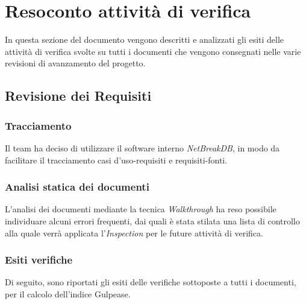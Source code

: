 \newpage
\section{Resoconto attività di verifica}

In questa sezione del documento vengono descritti e analizzati gli esiti delle attività di verifica svolte su tutti i documenti che vengono consegnati nelle varie revisioni di avanzamento del progetto.
	
	\subsection{Revisione dei Requisiti}
			
		\subsubsection{Tracciamento}
		Il team ha deciso di utilizzare il software interno \textit{NetBreakDB}, in modo da facilitare il tracciamento casi d’uso-requisiti e requisiti-fonti.
			
		\subsubsection{Analisi statica dei documenti}
		L’analisi dei documenti mediante la tecnica \textit{Walkthrough} ha reso possibile individuare alcuni errori frequenti, dai quali è stata stilata una lista di controllo alla quale verrà applicata l’\textit{Inspection} per le future attività di verifica.
			
		\subsubsection{Esiti verifiche}
		Di seguito, sono riportati gli esiti delle verifiche sottoposte a tutti i documenti, per il calcolo dell’indice Gulpease.
	
